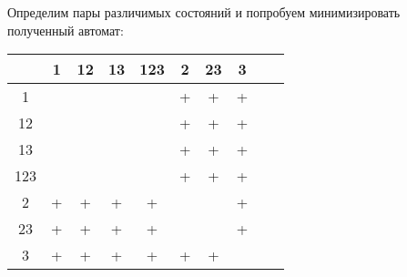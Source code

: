 \documentclass{article}
\begin{document}
\begin{enumerate}
        Определим пары различимых состояний и попробуем минимизировать полученный автомат:
        \begin{center}
            \begin{tabular}{ |c||c|c|c|c|c|c|c|c|c| } 
                \hline
                    & 1 & 12 & 13 & 123 & 2 & 23 & 3 \\
                \hline\hline
                1   &   &   &     &     & + &  + & + \\
                \hline
                12  &   &   &     &     & + &  + & + \\
                \hline
                13  &   &   &     &     & + &  + & + \\
                \hline
                123 &   &   &     &     & + &  + & + \\
                \hline
                2   & + & + &  +  &  +  &   &    & + \\
                \hline
                23  & + & + &  +  &  +  &   &    & + \\
                \hline
                3   & + & + &  +  &  +  & + & +  &   \\
                \hline
            \end{tabular}
        \end{center}
        

\end{enumerate}
\end{document}

